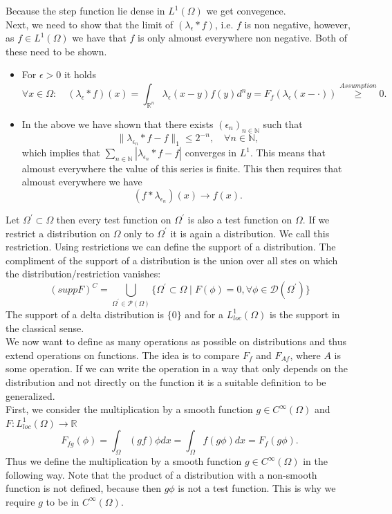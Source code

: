 \documentclass[A4,12pt,twoside]{book}
\begin{document}
{\begin{itemize}
$$$$
\end{itemize}
Because the step function lie dense in $L^1 (\Omega)$ we get convegence.\\
Next, we need to show that the limit of $(\lambda_\epsilon * f)$, i.e. $f$ is non negative, however, as $f \in L^1(\Omega)$ we have that $f$ is only almoust everywhere non negative. Both of these need to be shown.
\begin{itemize}
    \item For $\epsilon>0$ it holds 
    \[
    \forall x \in \Omega: \quad (\lambda_\epsilon * f) (x) = \int_{\mathbb{R}^n} \lambda_\epsilon (x-y) f(y) d^n y= F_f (\lambda_\epsilon (x-\cdot)) \stackrel{Assumption}{\geq} 0.
    \] 
    \item In the above we have shown that there exists $(\epsilon_n)_{n \in \mathbb{N}}$ such that 
    \[
    \| \lambda_{\epsilon_n} * f -f \|_1 \leq 2^{-n}, \quad \forall n \in \mathbb{N},
    \]
    which implies that $\sum_{n \in \mathbb{N}} |\lambda_{\epsilon_n} *f - f | $ converges in $L^1$. This means that almoust everywhere the value of this series is finite. This then requires that almoust everywhere we have 
    \[
    (f* \lambda_{\epsilon_n}) (x) \to f(x) .
    \]
\end{itemize}
}


Let $\Omega^\prime \subset \Omega$ then every test function on $\Omega^\prime$ is also a test function on $\Omega$. If we restrict a distribution on $\Omega$ only to $\Omega^\prime$ it is again a distribution. We call this restriction. Using restrictions we can define the support of a distribution. The compliment of the support of a distribution is the union over all stes on which the distribution/restriction vanishes:
$$
(supp F)^C = \bigcup_{\Omega^\prime \in \mathcal{P} (\Omega)} \{\Omega^\prime \subset \Omega \mid F(\phi) =0, \forall \phi \in \mathcal{D}(\Omega^\prime) \}
$$
The support of a delta distribution is $\{0\}$ and for a $L_{loc}^1(\Omega)$ is the support in the classical sense.\\
We now want to define as many operations as possible on distributions and thus extend operations on functions. The idea is to compare $F_f$ and $F_{Af}$, where $A$ is some operation. If we can write the operation in a way that only depends on the distribution and not directly on the function it is a suitable definition to be generalized.\\
First, we consider the multiplication by a smooth function $g \in C^\infty (\Omega)$ and $F: L_{loc}^1(\Omega) \to \mathbb{R}$
$$
F_{fg} (\phi) = \int_\Omega (gf) \phi dx = \int_\Omega f(g \phi) dx = F_f (g\phi).
$$
Thus we define the multiplication by a smooth function $g \in C^\infty (\Omega)$ in the following way.
Note that the product of a distribution with a non-smooth function is not defined, because then $g \phi$ is not a test function. This is why we require $g$ to be in $C^\infty(\Omega)$.
\end{document}
